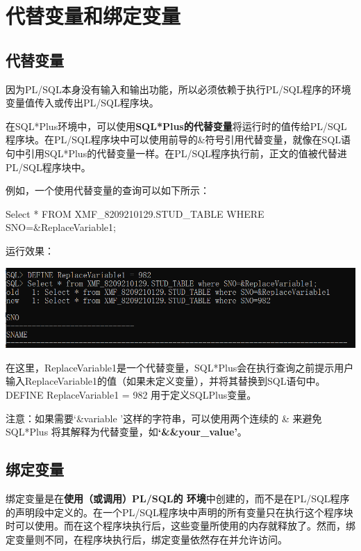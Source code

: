 \documentclass[11pt, a4paper, oneside, UTF8]{ctexbook}
\let\kaishu\relax %
\begin{document}
\section{代替变量和绑定变量}
\subsection{代替变量}
因为PL/SQL本身没有输入和输出功能，所以必须依赖于执行PL/SQL程序的环境变量值传入或传出PL/SQL程序块。

在SQL*Plus环境中，可以使用{\bfseries\kaishu SQL*Plus的代替变量}将运行时的值传给PL/SQL程序块。在PL/SQL程序块中可以使用前导的\&符号引用代替变量，就像在SQL语句中引用SQL*Plus的代替变量一样。在PL/SQL程序执行前，正文的值被代替进PL/SQL程序块中。

例如，一个使用代替变量的查询可以如下所示：
\begin{plsql}[]
Select * 
FROM XMF_8209210129.STUD_TABLE 
WHERE SNO=&ReplaceVariable1;
\end{plsql}

运行效果：
\begin{center}
  \begin{minipage}{\textwidth}
    \center
    \includegraphics[width=\textwidth]{picture/代替变量案例.png}
    \captionsetup{hypcap=false}
    \label{fig:代替变量案例}
  \end{minipage}
\end{center}


在这里，ReplaceVariable1是一个代替变量，SQL*Plus会在执行查询之前提示用户输入ReplaceVariable1的值（如果未定义变量），并将其替换到SQL语句中。DEFINE ReplaceVariable1 = 982 用于定义SQLPlus变量。

注意：如果需要`\&variable '这样的字符串，可以使用两个连续的 \& 来避免 SQL*Plus 将其解释为代替变量，如\textbf{`\&\&your\_value'}。
\subsection{绑定变量}
绑定变量是在{\bfseries\kaishu 使用（或调用）PL/SQL的 环境}中创建的，而不是在PL/SQL程序的声明段中定义的。在一个PL/SQL程序块中声明的所有变量只在执行这个程序块时可以使用。而在这个程序块执行后，这些变量所使用的内存就释放了。然而，绑定变量则不同，在程序块执行后，绑定变量依然存在并允许访问。
\end{document}
